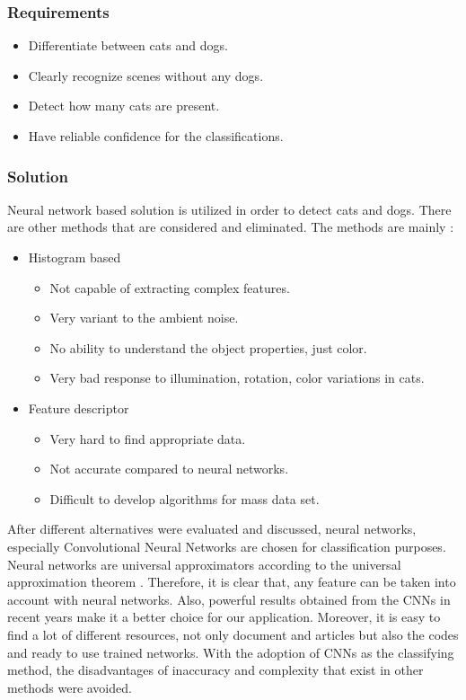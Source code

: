 \subsubsection{Requirements}
\begin{itemize}
    \item Differentiate between cats and dogs.
    \item Clearly recognize scenes without any dogs. 
    \item Detect how many cats are present.
    \item Have reliable confidence for the classifications.
\end{itemize}


\subsubsection{Solution}
Neural network based solution is utilized in order to detect cats and dogs. There are other methods that are considered and eliminated. The methods are mainly : 
\begin{itemize}
    \item Histogram based
    \begin{itemize}
        \item Not capable of extracting complex features.
        \item Very variant to the ambient noise.
        \item No ability to understand the object properties, just color.
        \item Very bad response to illumination, rotation, color variations in cats.
    \end{itemize}
    \item Feature descriptor
    \begin{itemize}
        \item Very hard to find appropriate data.
        \item Not accurate compared to neural networks.
        \item Difficult to develop algorithms for mass data set.
    \end{itemize}
\end{itemize}


After different alternatives were evaluated and discussed, neural networks, especially Convolutional Neural Networks are chosen for classification purposes. Neural networks are universal approximators according to the universal approximation theorem \cite{bib::universalApproximator}. Therefore, it is clear that, any feature can be taken into account with neural networks. Also, powerful results obtained from the CNNs in recent years \cite{cite:CNNPowerful} make it a better choice for our application. Moreover, it is easy to find a lot of different resources, not only document and articles but also the codes and ready to use trained networks. With the adoption of CNNs as the classifying method, the disadvantages of inaccuracy and complexity that exist in other methods were avoided.

